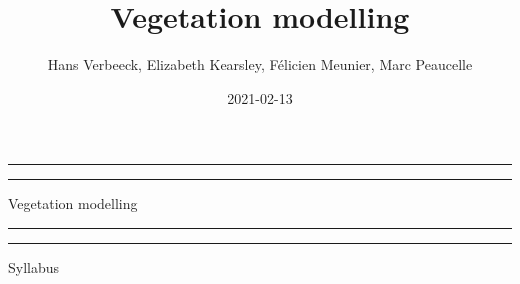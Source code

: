 \documentclass[
  oneside]{book}
\title{Vegetation modelling}
\author{Hans Verbeeck, Elizabeth Kearsley, Félicien Meunier, Marc Peaucelle}
\date{2021-02-13}
\begin{document}
\maketitle

\newcommand{\plogo}{\fbox{$\mathcal{PL}$}} %
\frontmatter


\begin{titlepage} %

	\centering %
	
	\scshape %
	
	\vspace*{\baselineskip} %
	
	
	\vspace{12\baselineskip}
	
	\rule{\textwidth}{1.6pt}\vspace*{-\baselineskip}\vspace*{2pt} %
	\rule{\textwidth}{0.4pt} %
	
	\vspace{0.75\baselineskip} %
	
	{\LARGE Vegetation modelling\\} %
	
	\vspace{0.75\baselineskip} %
	
	\rule{\textwidth}{0.4pt}\vspace*{-\baselineskip}\vspace{3.2pt} %
	\rule{\textwidth}{1.6pt} %
	
	\vspace{2\baselineskip} %
	
	
	Syllabus %
	
	\vspace*{3\baselineskip} %
	
	

\end{titlepage}
\end{document}
